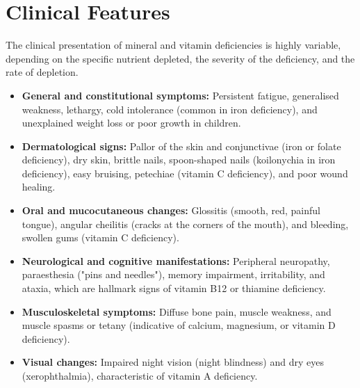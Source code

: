 \section*{Clinical Features}
The clinical presentation of mineral and vitamin deficiencies is highly variable, depending on the specific nutrient depleted, the severity of the deficiency, and the rate of depletion.
\begin{itemize}
    \item \textbf{General and constitutional symptoms:} Persistent fatigue, generalised weakness, lethargy, cold intolerance (common in iron deficiency), and unexplained weight loss or poor growth in children.
    \item \textbf{Dermatological signs:} Pallor of the skin and conjunctivae (iron or folate deficiency), dry skin, brittle nails, spoon-shaped nails (koilonychia in iron deficiency), easy bruising, petechiae (vitamin C deficiency), and poor wound healing.
    \item \textbf{Oral and mucocutaneous changes:} Glossitis (smooth, red, painful tongue), angular cheilitis (cracks at the corners of the mouth), and bleeding, swollen gums (vitamin C deficiency).
    \item \textbf{Neurological and cognitive manifestations:} Peripheral neuropathy, paraesthesia ("pins and needles"), memory impairment, irritability, and ataxia, which are hallmark signs of vitamin B12 or thiamine deficiency.
    \item \textbf{Musculoskeletal symptoms:} Diffuse bone pain, muscle weakness, and muscle spasms or tetany (indicative of calcium, magnesium, or vitamin D deficiency).
    \item \textbf{Visual changes:} Impaired night vision (night blindness) and dry eyes (xerophthalmia), characteristic of vitamin A deficiency.
\end{itemize}

